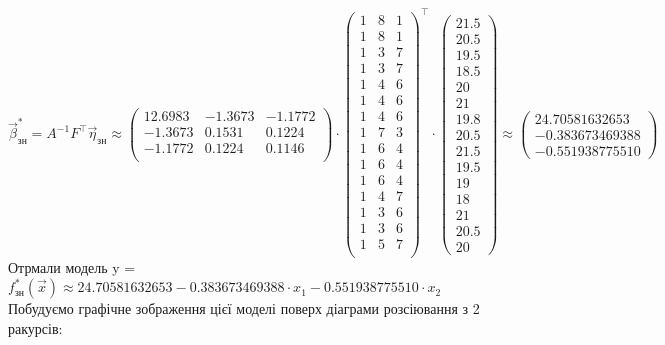 \documentclass[12 pt]{article}
\begin{document}
 $$
\vec{\beta}^*_\text{зн} = A^{-1} F^\top \vec{\eta}_\text{зн} \approx 
\begin{pmatrix}12.6983 &-1.3673&-1.1772\\
    -1.3673 & 0.1531 &0.1224 \\
    -1.1772 & 0.1224 &0.1146 \\
    \end{pmatrix}
\cdot 
\begin{pmatrix}1 &8 &1 \\
    1 &8 &1 \\
    1 &3 &7 \\
    1 &3 &7 \\
    1 &4 &6 \\
    1 &4 &6 \\
    1 &4 &6 \\
    1 &7 &3 \\
    1 &6 &4 \\
    1 &6 &4 \\
    1 &6 &4 \\
    1 &4 &7 \\
    1 &3 &6 \\
    1 &3 &6 \\
    1 &5 &7 \\
    \end{pmatrix}^\top
    \cdot 
    \begin{pmatrix}21.5 \\20.5 \\19.5 \\18.5 \\20 \\21 \\19.8 \\20.5 \\21.5 \\19.5 \\19 \\18 \\21 \\20.5 \\20\end{pmatrix}
    \approx 
    \begin{pmatrix}24.70581632653 \\-0.383673469388 \\-0.551938775510 \end{pmatrix}
 $$
 Отрмали модель y = $f^*_\text{зн}(\vec{x}) \approx 24.70581632653-0.383673469388\cdot x_1-0.551938775510\cdot x_2 $ \\ 
 Побудуємо графічне зображення цієї моделі поверх діаграми розсіювання з 2 ракурсів: \\ 
\end{document}
